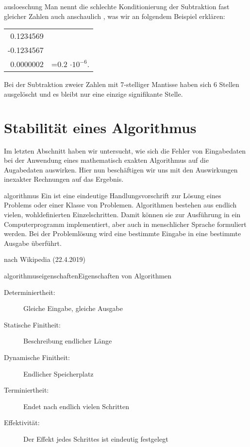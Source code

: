 \begin{Bemerkung}{ausloeschung}
  Man nennt die schlechte Konditionierung der Subtraktion fast
  gleicher Zahlen auch anschaulich , was wir an
  folgendem Beispiel erklären:
  \begin{center}
    \begin{tabular}{r@{}l}
      0.1234569&\\
      -0.1234567&\\\hline
      0.0000002&=0.2 $\cdot 10^{-6}$.
    \end{tabular}
  \end{center}
  Bei der Subtraktion zweier Zahlen mit 7-stelliger Mantisse haben
  sich 6 Stellen ausgelöscht und es bleibt nur eine einzige
  signifikante Stelle.
\end{Bemerkung}

\section{Stabilität eines Algorithmus}

\begin{intro}
  Im letzten Abschnitt haben wir untersucht, wie sich die Fehler von
  Eingabedaten bei der Anwendung eines mathematisch exakten
  Algorithmus auf die Augabedaten auswirken. Hier nun beschäftigen wir
  uns mit den Auswirkungen inexakter Rechnungen auf das Ergebnis.
\end{intro}

\begin{Definition}{algorithmus}
  Ein  ist eine eindeutige Handlungsvorschrift zur Lösung
  eines Problems oder einer Klasse von Problemen. Algorithmen bestehen
  aus endlich vielen, wohldefinierten Einzelschritten. Damit können
  sie zur Ausführung in ein Computerprogramm implementiert, aber auch
  in menschlicher Sprache formuliert werden. Bei der Problemlösung
  wird eine bestimmte Eingabe in eine bestimmte Ausgabe überführt.

  \hfill nach Wikipedia (22.4.2019)
\end{Definition}

\begin{Bemerkung*}{algorithmuseigenschaften}{Eigenschaften von Algorithmen}
  \begin{description}
  \item[Determiniertheit:] Gleiche Eingabe, gleiche Ausgabe
  \item[Statische Finitheit:] Beschreibung endlicher Länge
  \item[Dynamische Finitheit:] Endlicher Speicherplatz
  \item[Terminiertheit:] Endet nach endlich vielen Schritten
  \item[Effektivität:] Der Effekt jedes Schrittes ist eindeutig festgelegt
  \end{description}
\end{Bemerkung*}

